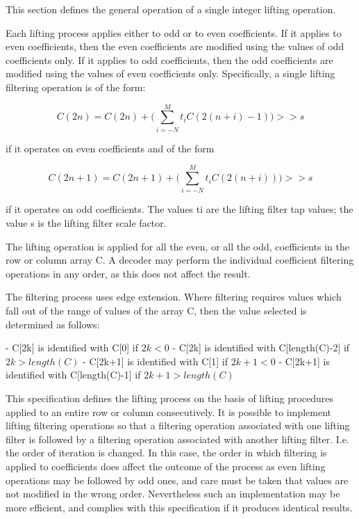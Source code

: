 This section defines the general operation of a single integer lifting
operation.

Each lifting process applies either to odd or to even coefficients. If
it applies to even coefficients, then the even coefficients are modified
using the values of odd coefficients only. If it applies to odd
coefficients, then the odd coefficients are modified using the values of
even coefficients only. Specifically, a single lifting filtering
operation is of the form:

\begin{displaymath}
  C(2n) = C(2n) + \big( \sum^M_{i=-N} t_i C(2(n+i) - 1) \big) >> s
\end{displaymath}

if it operates on even coefficients and of the form

\begin{displaymath}
  C(2n+1) = C(2n+1) + \big( \sum^M_{i=-N} t_i C(2(n+i)) \big) >> s
\end{displaymath}

if it operates on odd coefficients. The values ti are the lifting filter
tap values; the value s is the lifting filter scale factor.

The lifting operation is applied for all the even, or all the odd,
coefficients in the row or column array C. A decoder may perform the
individual coefficient filtering operations in any order, as this does
not affect the result.

The filtering process uses edge extension.  Where filtering requires
values which fall out of the range of values of the array C, then the
value selected is determined as follows:

- C[2k] is identified with C[0] if $2k < 0$
- C[2k] is identified with C[length(C)-2] if $2k > length(C)$
- C[2k+1] is identified with C[1] if $2k+1 < 0$
- C[2k+1] is identified with C[length(C)-1] if $2k + 1 > length(C)$

\begin{informative}
This specification defines the lifting process on the basis of lifting
procedures applied to an entire row or column consecutively. It is
possible to implement lifting filtering operations so that a filtering
operation associated with one lifting filter is followed by a filtering
operation associated with another lifting filter. I.e. the order of
iteration is changed. In this case, the order in which filtering is
applied to coefficients does affect the outcome of the process as even
lifting operations may be followed by odd ones, and care must be taken
that values are not modified in the wrong order. Nevertheless such an
implementation may be more efficient, and complies with this
specification if it produces identical results.
\end{informative}

